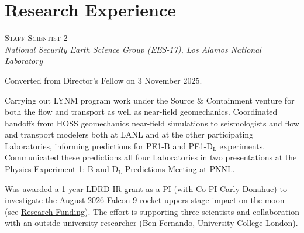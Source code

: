 \documentclass[11pt, letterpaper]{article}
\newcommand{\years}[1]{\marginnote{\scriptsize #1}}
\begin{document}



\section*{Research Experience}
\setlength{\parindent}{14pt}
\years{2025 - pres.}\textsc{Staff Scientist 2}\\
\textit{National Security Earth Science Group (EES-17), Los Alamos National Laboratory}

    \vspace{3pt} \noindent  
    Converted from Director's Fellow on 3 November 2025. 

    Carrying out LYNM program work under the Source \& Containment venture for
    both the flow and transport as well as near-field geomechanics. Coordinated
    handoffs from HOSS geomechanics near-field simulations to seismologists and
    flow and transport modelers both at LANL and at the other participating
    Laboratories, informing predictions for PE1-B and PE1-D$_{\mathrm{L}}$ experiments.
    Communicated these predictions all four Laboratories in two presentations
    at the Physics Experiment 1: B and D$_{\mathrm{L}}$ Predictions Meeting at PNNL. 

    Was awarded a 1-year LDRD-IR grant as a PI (with Co-PI Carly Donahue) to
    investigate the August 2026 Falcon 9 rocket uppers stage impact on the moon
    (see \hyperref[sec:funding]{Research Funding}). The effort is supporting
    three scientists and collaboration with an outside university researcher
    (Ben Fernando, University College London). 
\end{document}
